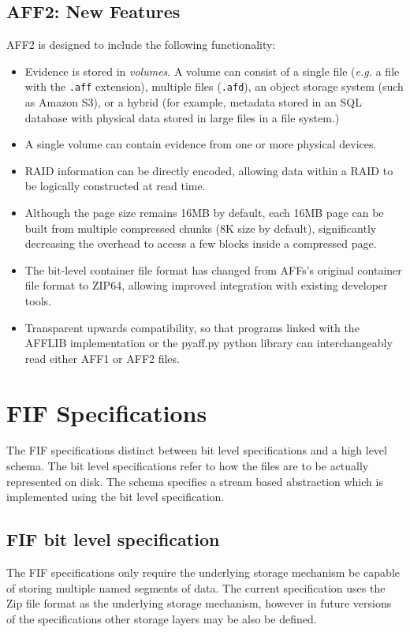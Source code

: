 \documentclass[10pt, conference]{IEEEtran}
\begin{document}
\subsection{AFF2: New Features}
AFF2 is designed to include the following functionality:

\begin{itemize}
\item Evidence is stored in \emph{volumes}. A volume can consist of a
  single file (\emph{e.g.} a file with the \texttt{.aff} extension), multiple files (\texttt{.afd}), an
  object storage system (such as Amazon S3), or a hybrid (for example,
  metadata stored in an SQL database with physical data stored in
  large files in a file system.)
\item A single volume can contain evidence from one or more physical
  devices.
\item RAID information can be directly encoded, allowing data within a
  RAID to be logically constructed at read time.
\item Although the page size remains 16MB by default, each 16MB page
  can be built from multiple compressed chunks (8K size by default),
  significantly decreasing the overhead to access a few blocks inside
  a compressed page.
\item The bit-level container file format has changed from AFFs's
  original container file format to ZIP64, allowing improved
  integration with existing developer tools.
\item Transparent upwards compatibility, so that programs linked with
  the AFFLIB implementation or the pyaff.py python library can
  interchangeably read either AFF1 or AFF2 files. 
\end{itemize}


\section{FIF Specifications}
The FIF specifications distinct between bit level specifications and
a high level schema. The bit level specifications refer to how the
files are to be actually represented on disk. The schema specifies a
stream based abstraction which is implemented using the bit level
specification. 

\subsection{FIF bit level specification}
The FIF specifications only require the underlying storage mechanism
be capable of storing multiple named segments of data. The current
specification uses the Zip file format as the underlying storage
mechanism, however in future versions of the specifications other
storage layers may be also be defined.
\end{document}
